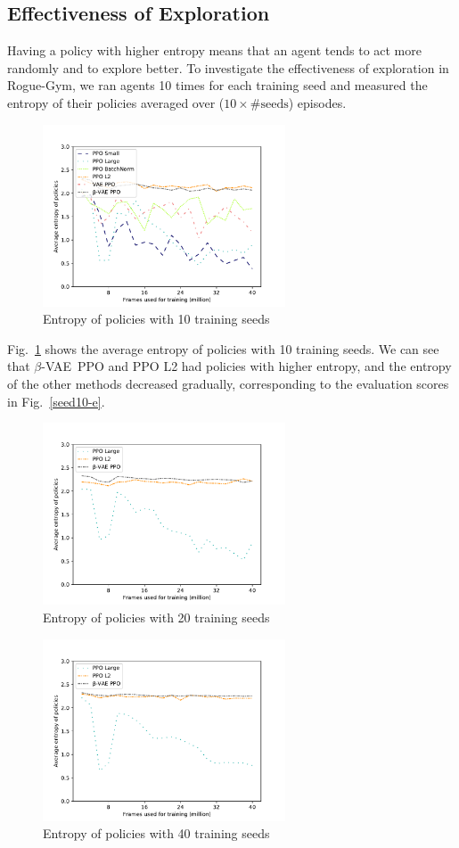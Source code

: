 \documentclass[conference]{IEEEtran}
\newcommand\bvae{$\beta$-VAE}
\newcommand\bppo{\bvae~PPO}
\begin{document}
\subsection{Effectiveness of Exploration}
Having a policy with higher entropy means that an agent tends to act more
randomly and to explore better.
To investigate the effectiveness of exploration in Rogue-Gym, we ran
agents 10 times for each training seed and measured the entropy of their
policies averaged over ($10\times\text{\#seeds}$) episodes.
\begin{figure}[t]
 \centering
 \includegraphics[width=7.2cm]{pictures/ent10.pdf}
 \caption{Entropy of policies with 10 training seeds} \label{seed10-en}
\end{figure}

Fig.~\ref{seed10-en} shows the average entropy of policies with 10 training seeds.
We can see that \bppo{} and PPO L2 had policies with higher entropy, and
the entropy of the other methods decreased gradually, corresponding to
the evaluation scores in Fig.~\ref{seed10-e}.
\begin{figure}[t]
 \centering
 \includegraphics[width=7.2cm]{pictures/ent20.pdf}
 \caption{Entropy of policies with 20 training seeds} \label{seed20-en}
\end{figure}
\begin{figure}[t]
 \centering
 \includegraphics[width=7.2cm]{pictures/ent40.pdf}
 \caption{Entropy of policies with 40 training seeds} \label{seed40-en}
\end{figure}
\end{document}
